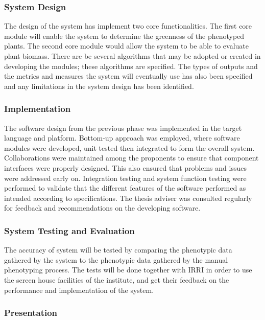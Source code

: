 \subsubsection{System Design}
\label{sec:softwareconceptanddesign}

The design of the system has implement two core functionalities. The first core module will enable the system to determine the greenness of the phenotyped plants. The second core module would allow the system to be able to evaluate plant biomass.  There are be several algorithms that may be adopted or created in developing the modules; these algorithms are specified. The types of outputs and the metrics and measures the system will eventually use has also been specified and any limitations in the system design has been identified.

\subsubsection{Implementation}
\label{sec:implementation}

The software design from the previous phase was implemented in the target language and platform. Bottom-up approach was employed, where software modules were developed, unit tested then integrated to form the overall system. Collaborations were maintained among the proponents to ensure that component interfaces were properly designed. This also ensured that problems and issues were addressed early on. Integration testing and system function testing were performed to validate that the different features of the software performed as intended according to specifications. The thesis adviser was consulted regularly for feedback and recommendations on the developing software. 


\subsubsection{System Testing and Evaluation}
\label{sec:systemtesingandrevisions}

The accuracy of system will be tested by comparing the phenotypic data gathered by the system to the phenotypic data gathered by the manual phenotyping process. The tests will be done together with IRRI in order to use the screen house facilities of the institute, and get their feedback on the performance and implementation of the system.

\subsubsection{Presentation}
\label{sec:presentation}

